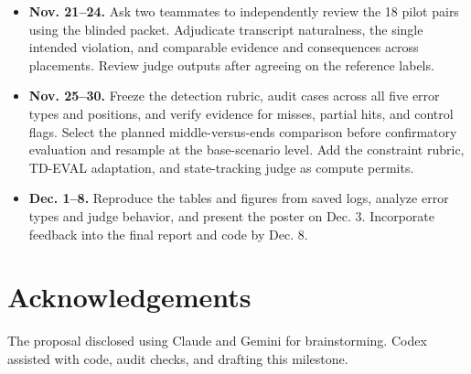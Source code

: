 \documentclass[11pt]{article}
\begin{document}
\begin{itemize}
  \item \textbf{Nov. 21--24.} Ask two teammates to independently review the 18 pilot pairs using the blinded packet. Adjudicate transcript naturalness, the single intended violation, and comparable evidence and consequences across placements. Review judge outputs after agreeing on the reference labels.
  \item \textbf{Nov. 25--30.} Freeze the detection rubric, audit cases across all five error types and positions, and verify evidence for misses, partial hits, and control flags. Select the planned middle-versus-ends comparison before confirmatory evaluation and resample at the base-scenario level. Add the constraint rubric, TD-EVAL adaptation, and state-tracking judge as compute permits.
  \item \textbf{Dec. 1--8.} Reproduce the tables and figures from saved logs, analyze error types and judge behavior, and present the poster on Dec. 3. Incorporate feedback into the final report and code by Dec. 8.
\end{itemize}

\section*{Acknowledgements}
The proposal disclosed using Claude and Gemini for brainstorming. Codex assisted with code, audit checks, and drafting this milestone.

\clearpage

\end{document}
